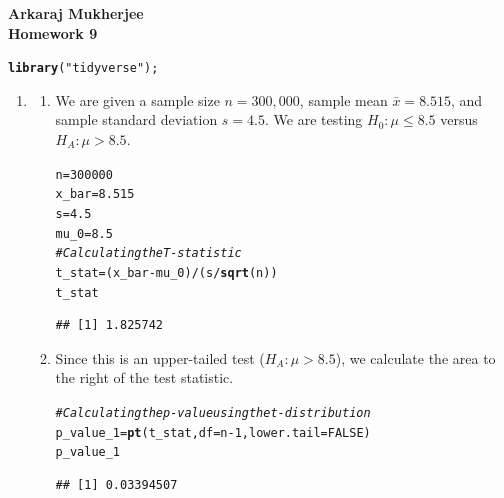 \documentclass[12pt,english]{article}\usepackage[]{graphicx}\usepackage[]{xcolor}
\makeatletter
\newcommand{\hlnum}[1]{\textcolor[rgb]{0.686,0.059,0.569}{#1}}%
\newcommand{\hlsng}[1]{\textcolor[rgb]{0.192,0.494,0.8}{#1}}%
\newcommand{\hlcom}[1]{\textcolor[rgb]{0.678,0.584,0.686}{\textit{#1}}}%
\newcommand{\hlopt}[1]{\textcolor[rgb]{0,0,0}{#1}}%
\newcommand{\hldef}[1]{\textcolor[rgb]{0.345,0.345,0.345}{#1}}%
\newcommand{\hlkwb}[1]{\textcolor[rgb]{0.69,0.353,0.396}{#1}}%
\newcommand{\hlkwc}[1]{\textcolor[rgb]{0.333,0.667,0.333}{#1}}%
\newcommand{\hlkwd}[1]{\textcolor[rgb]{0.737,0.353,0.396}{\textbf{#1}}}%
\newenvironment{kframe}{%
 \def\at@end@of@kframe{}%
 \ifinner\ifhmode%
  \def\at@end@of@kframe{\end{minipage}}%
  \begin{minipage}{\columnwidth}%
 \fi\fi%
 \def\FrameCommand##1{\hskip\@totalleftmargin \hskip-\fboxsep
 \colorbox{shadecolor}{##1}\hskip-\fboxsep
     \hskip-\linewidth \hskip-\@totalleftmargin \hskip\columnwidth}%
 \MakeFramed {\advance\hsize-\width
   \@totalleftmargin\z@ \linewidth\hsize
   \@setminipage}}%
 {\par\unskip\endMakeFramed%
 \at@end@of@kframe}
\newenvironment{knitrout}{}{} %
\makeatother
\begin{document}
{\bf Arkaraj Mukherjee}\\
{\bf Homework 9}
\begin{knitrout}
\color{fgcolor}\begin{kframe}
\begin{alltt}
\hlkwd{library}\hldef{(}\hlsng{"tidyverse"}\hldef{);}
\end{alltt}
\end{kframe}
\end{knitrout}

\begin{enumerate}[label=\arabic*.]
	\item
	\begin{enumerate}[label=(\alph*)]
		\item We are given a sample size $n = 300,000$, sample mean $\bar{x} = 8.515$, and sample standard deviation $s = 4.5$. We are testing $H_{0}:\mu\le8.5$ versus $H_{A}:\mu>8.5$.
\begin{knitrout}
\color{fgcolor}\begin{kframe}
\begin{alltt}
\hldef{n} \hlkwb{=} \hlnum{300000}
\hldef{x_bar} \hlkwb{=} \hlnum{8.515}
\hldef{s} \hlkwb{=} \hlnum{4.5}
\hldef{mu_0} \hlkwb{=} \hlnum{8.5}
\hlcom{#Calculating the T-statistic}
\hldef{t_stat} \hlkwb{=} \hldef{(x_bar} \hlopt{-} \hldef{mu_0)} \hlopt{/} \hldef{(s} \hlopt{/} \hlkwd{sqrt}\hldef{(n))}
\hldef{t_stat}
\end{alltt}
\begin{verbatim}
## [1] 1.825742
\end{verbatim}
\end{kframe}
\end{knitrout}
		\item Since this is an upper-tailed test ($H_A: \mu > 8.5$), we calculate the area to the right of the test statistic.
\begin{knitrout}
\color{fgcolor}\begin{kframe}
\begin{alltt}
\hlcom{#Calculating the p-value using the t-distribution}
\hldef{p_value_1} \hlkwb{=} \hlkwd{pt}\hldef{(t_stat,} \hlkwc{df} \hldef{= n} \hlopt{-} \hlnum{1}\hldef{,} \hlkwc{lower.tail} \hldef{=} \hlnum{FALSE}\hldef{)}
\hldef{p_value_1}
\end{alltt}
\begin{verbatim}
## [1] 0.03394507
\end{verbatim}

\end{kframe}
\end{knitrout}
\end{enumerate}
\end{enumerate}
\end{document}

